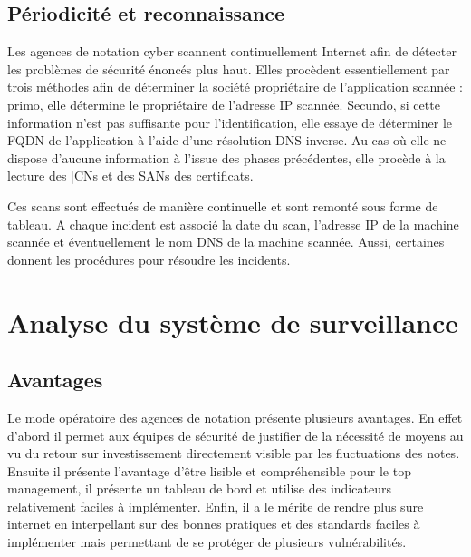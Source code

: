 \documentclass[a4paper,12pt]{book}
\theoremstyle{break}
\begin{document}
\begin{description}
\begin{itemize}
    \end{itemize}
    
\end{description}

\subsection{Périodicité et reconnaissance}
Les agences de notation cyber scannent continuellement Internet afin de détecter les problèmes de sécurité énoncés plus haut. Elles procèdent essentiellement par trois méthodes afin de déterminer la société propriétaire de l’application scannée : primo, elle détermine le propriétaire de l’adresse IP scannée. Secundo, si cette information n’est pas suffisante pour l’identification, elle essaye de déterminer le \ac{FQDN} de l’application à l’aide d’une résolution DNS inverse. Au cas où elle ne dispose d’aucune information à l’issue des phases précédentes, elle procède à la lecture des |\ac{CNs} et des \ac{SANs} des certificats. 


Ces scans sont effectués de manière continuelle et sont remonté sous forme de tableau. A chaque incident est associé la date du scan, l’adresse IP de la machine scannée et éventuellement le nom DNS de la machine scannée. Aussi, certaines donnent les procédures pour résoudre les incidents.


\section{Analyse du système de surveillance}

\subsection{Avantages}
Le mode opératoire des agences de notation présente plusieurs avantages. En effet d’abord il permet aux équipes de sécurité de justifier de la nécessité de moyens au vu du retour sur investissement directement visible par les fluctuations des notes.\newline
Ensuite il présente l’avantage d’être lisible et compréhensible pour le top management, il présente un tableau de bord et utilise des indicateurs relativement faciles à implémenter.\newline
Enfin, il a le mérite de rendre plus sure internet en interpellant sur des bonnes pratiques et des standards faciles à implémenter mais permettant de se protéger de plusieurs vulnérabilités. 
\end{document}
